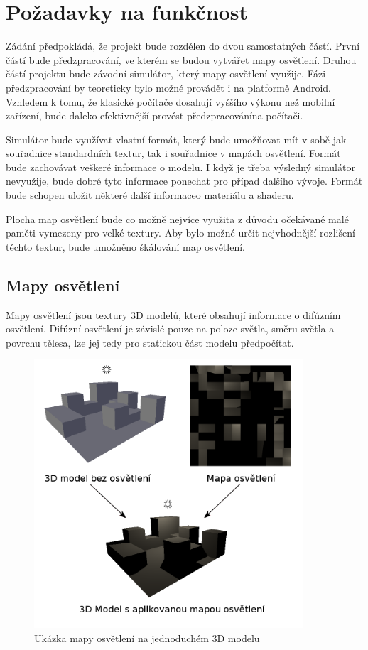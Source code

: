 \documentclass[11pt,twoside,a4paper]{book}
\begin{document}
\section{Požadavky na funkčnost}
Zádání předpokládá, že projekt bude rozdělen do dvou samostatných částí. První částí bude předzpracování, ve kterém se budou vytvářet mapy osvětlení. Druhou částí projektu bude závodní simulátor, který mapy osvětlení využije. Fázi předzpracování by teoreticky bylo možné provádět i na platformě Android. Vzhledem k tomu, že klasické počítače dosahují vyššího výkonu než mobilní zařízení, bude daleko efektivnější provést předzpracování\linebreak na počítači.

Simulátor bude využívat vlastní formát, který bude umožňovat mít v sobě jak souřadnice standardních textur, tak i souřadnice v mapách osvětlení. Formát bude zachovávat veškeré informace o modelu. I když je třeba výsledný simulátor nevyužije, bude dobré tyto informace ponechat pro případ dalšího vývoje. Formát bude schopen uložit některé další informace\linebreak o materiálu a shaderu.

Plocha map osvětlení bude co možně nejvíce využita z důvodu očekávané malé paměti vymezeny pro velké textury. Aby bylo možné určit nejvhodnější rozlišení těchto textur, bude umožněno škálování map osvětlení.
\newpage

\subsection{Mapy osvětlení}
Mapy osvětlení jsou textury 3D modelů, které obsahují informace o difúzním osvětlení. Difúzní osvětlení je závislé pouze na poloze světla, směru světla a povrchu tělesa, lze jej tedy pro statickou část modelu předpočítat.

\begin{center}
\begin{figure}[h!]
\includegraphics[width=100mm]{figures/lmapply.png}
\caption{Ukázka mapy osvětlení na jednoduchém 3D modelu}
\end{figure}
\end{center}
\end{document}
